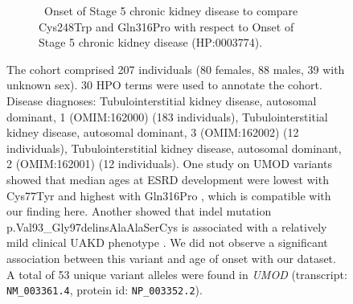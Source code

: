 \begin{figure}[htbp]
\vspace{2em}
\begin{subfigure}[b]{0.95\textwidth}
\captionsetup{justification=raggedright,singlelinecheck=false}
\caption{ Onset of Stage 5 chronic kidney disease to compare Cys248Trp and Gln316Pro with respect to Onset of
Stage 5 chronic kidney disease (HP:0003774). }
\end{subfigure}

\caption{ The cohort comprised 207 individuals (80 females, 88 males, 39 with unknown sex). 30 HPO terms were used to annotate the cohort. 
Disease diagnoses: Tubulointerstitial kidney disease, autosomal dominant, 1 (OMIM:162000) (183 individuals), 
Tubulointerstitial kidney disease, autosomal dominant, 3 (OMIM:162002) (12 individuals), 
Tubulointerstitial kidney disease, autosomal dominant, 2 (OMIM:162001) (12 individuals). 
One study on UMOD variants showed that median ages at ESRD development were lowest with Cys77Tyr 
and highest with Gln316Pro \cite{PMID_23723338}, which is compatible with our finding here. Another showed that
indel mutation p.Val93\_Gly97delinsAlaAlaSerCys is associated with a relatively mild clinical UAKD phenotype \cite{PMID_22034507}. We did
not observe a significant association between this variant and age of onset with our dataset. 
A total of 53 unique variant alleles were found in \textit{UMOD} (transcript: \texttt{NM\_003361.4}, protein id: \texttt{NP\_003352.2}).}
\end{figure}

